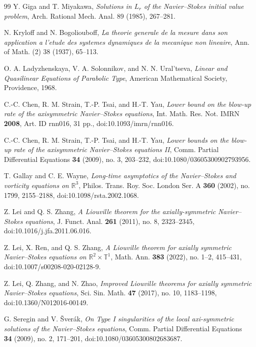 \documentclass[11pt]{amsart}
\theoremstyle{plain}
\theoremstyle{definition}
\theoremstyle{remark}
\numberwithin{equation}{section}
\begin{document}
\begin{thebibliography}{99}
Y. Giga and T. Miyakawa,
\emph{Solutions in \(L_r\) of the Navier--Stokes initial value problem},
Arch. Rational Mech. Anal. 89 (1985), 267--281.

N. Kryloff and N. Bogoliouboff,
\emph{La theorie generale de la mesure dans son application a l'etude des
systemes dynamiques de la mecanique non lineaire},
Ann. of Math. (2) 38 (1937), 65--113.

O. A. Ladyzhenskaya, V. A. Solonnikov, and N. N. Ural'tseva,
\emph{Linear and Quasilinear Equations of Parabolic Type},
American Mathematical Society, Providence, 1968.

C.-C. Chen, R. M. Strain, T.-P. Tsai, and H.-T. Yau,
\emph{Lower bound on the blow-up rate of the axisymmetric Navier--Stokes
equations},
Int. Math. Res. Not. IMRN \textbf{2008}, Art. ID rnn016, 31 pp.,
doi:10.1093/imrn/rnn016.

C.-C. Chen, R. M. Strain, T.-P. Tsai, and H.-T. Yau,
\emph{Lower bounds on the blow-up rate of the axisymmetric Navier--Stokes
equations II},
Comm. Partial Differential Equations \textbf{34} (2009), no. 3, 203--232,
doi:10.1080/03605300902793956.

T. Gallay and C. E. Wayne,
\emph{Long-time asymptotics of the Navier--Stokes and vorticity equations on
\(\mathbb R^3\)},
Philos. Trans. Roy. Soc. London Ser. A \textbf{360} (2002), no. 1799,
2155--2188, doi:10.1098/rsta.2002.1068.

Z. Lei and Q. S. Zhang,
\emph{A Liouville theorem for the axially-symmetric Navier--Stokes equations},
J. Funct. Anal. \textbf{261} (2011), no. 8, 2323--2345,
doi:10.1016/j.jfa.2011.06.016.

Z. Lei, X. Ren, and Q. S. Zhang,
\emph{A Liouville theorem for axially symmetric Navier--Stokes equations on
\(\mathbb R^2\times\mathbb T^1\)},
Math. Ann. \textbf{383} (2022), no. 1--2, 415--431,
doi:10.1007/s00208-020-02128-9.

Z. Lei, Q. Zhang, and N. Zhao,
\emph{Improved Liouville theorems for axially symmetric Navier--Stokes
equations},
Sci. Sin. Math. \textbf{47} (2017), no. 10, 1183--1198,
doi:10.1360/N012016-00149.

G. Seregin and V. \v{S}ver\'ak,
\emph{On Type I singularities of the local axi-symmetric solutions of the
Navier--Stokes equations},
Comm. Partial Differential Equations \textbf{34} (2009), no. 2, 171--201,
doi:10.1080/03605300802683687.

\end{thebibliography}
\end{document}
